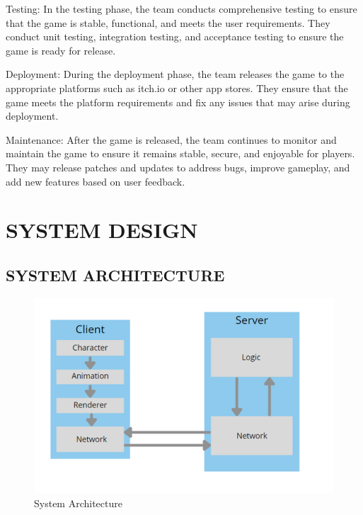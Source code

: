 \documentclass[12pt]{report}
\begin{document}
Testing: In the testing phase, the team conducts comprehensive testing to ensure that the game is stable, functional, and meets the user requirements. They conduct unit testing, integration testing, and acceptance testing to ensure the game is ready for release.

Deployment: During the deployment phase, the team releases the game to the appropriate platforms such as itch.io or other app stores. They ensure that the game meets the platform requirements and fix any issues that may arise during deployment.

Maintenance: After the game is released, the team continues to monitor and maintain the game to ensure it remains stable, secure, and enjoyable for players. They may release patches and updates to address bugs, improve gameplay, and add new features based on user feedback.


\clearpage


\centering
\section{ SYSTEM DESIGN}
\raggedright
\subsection{SYSTEM ARCHITECTURE}

\justifying
\setlength{\parindent}{0em}
\setlength{\parskip}{0em}
\renewcommand{\baselinestretch}{1.5}

\vspace{0.5cm}
\begin{figure}[h]
\centering
\includegraphics[scale=0.7]{Data Flow diagram-0.png}
\caption{ System Architecture}
\label{ System Architecture}
\end{figure}
\vspace{0.1cm}
\end{document}
